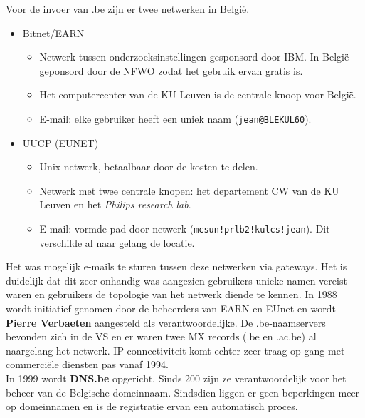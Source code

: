 \documentclass[../main.tex]{subfiles}
\begin{document}
\begin{solution}
Voor de invoer van .be zijn er twee netwerken in Belgi\"e.
\begin{itemize}
	\item Bitnet/EARN
	\begin{itemize}
		\item Netwerk tussen onderzoeksinstellingen gesponsord door IBM. In Belgi\"e geponsord door de NFWO zodat het gebruik ervan gratis is.
		\item Het computercenter van de KU Leuven is de centrale knoop voor Belgi\"e.
		\item E-mail: elke gebruiker heeft een uniek naam (\texttt{jean@BLEKUL60}).
	\end{itemize}
	\item UUCP (EUNET)
	\begin{itemize}
		\item Unix netwerk, betaalbaar door de kosten te delen.
		\item Netwerk met twee centrale knopen: het departement CW van de  KU Leuven en het \emph{Philips research lab}.
		\item E-mail: vormde pad door netwerk (\texttt{mcsun!prlb2!kulcs!jean}). Dit verschilde al naar gelang de locatie.
	\end{itemize}
\end{itemize}
Het was mogelijk e-mails te sturen tussen deze netwerken via gateways. Het is duidelijk dat dit zeer onhandig was aangezien gebruikers unieke namen vereist waren en gebruikers de topologie van het netwerk diende te kennen. In 1988 wordt initiatief genomen door de beheerders van EARN en EUnet en wordt \textbf{Pierre Verbaeten} aangesteld als verantwoordelijke. De .be-naamservers bevonden zich in de VS en er waren twee MX records (.be en .ac.be) al naargelang het netwerk. IP connectiviteit komt echter zeer traag op gang met commerci\"ele diensten pas vanaf 1994.\\
In 1999 wordt \textbf{DNS.be} opgericht. Sinds 200 zijn ze verantwoordelijk voor het beheer van de Belgische domeinnaam. Sindsdien liggen er geen beperkingen meer op domeinnamen en is de registratie ervan een automatisch proces.
\end{solution}
\end{document}

